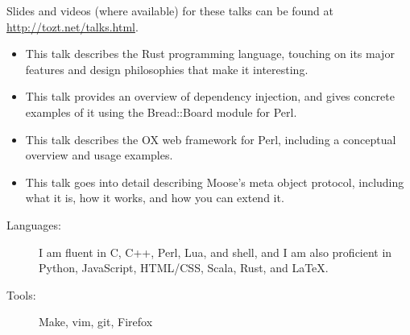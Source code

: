 \documentclass[letterpaper]{article}
\begin{document}

\small{Slides and videos (where available) for these talks can be found at
\url{http://tozt.net/talks.html}.}\normalsize\vspace{-3pt}

\begin{itemize}
    \item {} \vspace{6pt}\linebreak
        \small{This talk describes the Rust programming language, touching on
        its major features and design philosophies that make it
        interesting.}\normalsize
    \item {} \vspace{6pt}\linebreak
        \small{This talk provides an overview of dependency injection, and
        gives concrete examples of it using the Bread::Board module for Perl.}\normalsize
    \item {} \vspace{6pt}\linebreak
        \small{This talk describes the OX web framework for Perl, including a
        conceptual overview and usage examples.}\normalsize
    \item {} \vspace{6pt}\linebreak
        \small{This talk goes into detail describing Moose's meta object
        protocol, including what it is, how it works, and how you can extend
        it.}\normalsize
\end{itemize}
\begin{description}
    \item[Languages:] \small{I am fluent in C, C++, Perl, Lua, and shell, and I am also proficient in Python, JavaScript, HTML/CSS, Scala, Rust, and LaTeX.}\normalsize\vspace{-6pt}
    \item[Tools:] \small{Make, vim, git, Firefox}\normalsize
\end{description}
\end{document}
